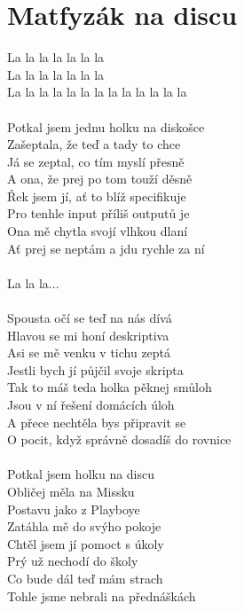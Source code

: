 \section{Matfyzák na discu}
\begin{multicols}{2}
La la la la la la la\\
La la la la la la la\\
La la la la la la la la la la la la la\\
\\
Potkal jsem jednu holku na diskošce\\
Zašeptala, že teď a tady to chce\\
Já se zeptal, co tím myslí přesně\\
A ona, že prej po tom touží děsně\\
Řek jsem jí, ať to blíž specifikuje\\
Pro tenhle input příliš outputů je\\
Ona mě chytla svojí vlhkou dlaní\\
Ať prej se neptám a jdu rychle za ní\\
\\
La la la...\\
\\
Spousta očí se teď na nás dívá\\
Hlavou se mi honí deskriptiva\\
Asi se mě venku v tichu zeptá\\
Jestli bych jí půjčil svoje skripta\\
Tak to máš teda holka pěknej smůloh\\
Jsou v ní řešení domácích úloh\\
A přece nechtěla bys připravit se\\
O pocit, když správně dosadíš do rovnice\\
\\
Potkal jsem holku na discu\\
Obličej měla na Missku\\
Postavu jako z Playboye\\
Zatáhla mě do svýho pokoje\\
Chtěl jsem jí pomoct s úkoly\\
Prý už nechodí do školy\\
Co bude dál teď mám strach\\
Tohle jsme nebrali na přednáškách\\
\\

\end{multicols}
